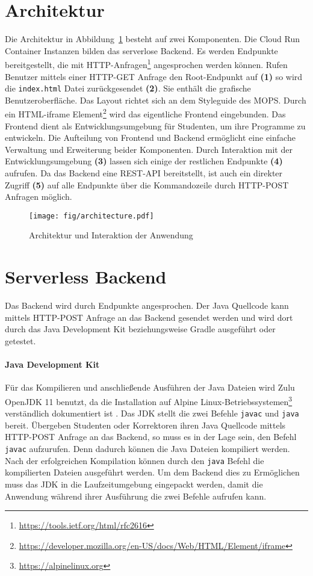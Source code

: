 \section{Architektur}
Die Architektur in Abbildung~\ref{fig:architecture} besteht auf zwei
Komponenten.
Die Cloud Run Container Instanzen bilden das serverlose Backend.
Es werden Endpunkte bereitgestellt, die mit
HTTP-Anfragen\footnote{\url{https://tools.ietf.org/html/rfc2616}}
angesprochen werden können. Rufen Benutzer
mittels einer HTTP-GET Anfrage den
Root-Endpunkt auf \textbf{(1)} so wird
die \texttt{index.html} Datei zurückgesendet \textbf{(2)}.
Sie enthält die grafische Benutzeroberfläche. Das Layout richtet
sich an dem Styleguide des MOPS. Durch ein
HTML-iframe Element\footnote{\url{https://developer.mozilla.org/en-US/docs/Web/HTML/Element/iframe}}
wird das eigentliche Frontend eingebunden. Das Frontend dient als Entwicklungsumgebung für
Studenten, um ihre Programme zu entwickeln. Die Aufteilung von Frontend und Backend
ermöglicht eine einfache Verwaltung und Erweiterung beider Komponenten.
Durch Interaktion mit der Entwicklungsumgebung \textbf{(3)} lassen sich einige
der restlichen Endpunkte \textbf{(4)} aufrufen. 
Da das Backend eine REST-API bereitstellt, ist auch ein direkter Zugriff \textbf{(5)} auf alle 
Endpunkte über die Kommandozeile durch HTTP-POST Anfragen möglich.

\begin{figure}
  \centering
  \texttt{[image: fig/architecture.pdf]}
  \caption{Architektur und Interaktion der Anwendung}
  \label{fig:architecture}
\end{figure}

\section{Serverless Backend}
Das Backend wird durch Endpunkte angesprochen.
Der Java Quellcode kann mittels HTTP-POST Anfrage an das
Backend gesendet werden und wird dort durch das Java Development Kit
beziehungsweise Gradle ausgeführt oder getestet.


\paragraph{Java Development Kit} Für das Kompilieren und
anschließende Ausführen der Java Dateien wird
Zulu OpenJDK 11 benutzt, da die Installation auf
Alpine Linux-Betriebssystemen\footnote{\url{https://alpinelinux.org}}
verständlich dokumentiert ist \cite{AzulZuluJDK}.
Das JDK stellt die zwei Befehle \texttt{javac} und \texttt{java} bereit.
Übergeben Studenten oder Korrektoren ihren Java Quellcode mittels HTTP-POST Anfrage an
das Backend, so muss es in der Lage sein, den Befehl \texttt{javac}
aufzurufen. Denn dadurch können die Java Dateien kompiliert werden.
Nach der erfolgreichen Kompilation können durch den \texttt{java} Befehl die kompilierten Dateien
ausgeführt werden. Um dem Backend dies zu Ermöglichen muss das JDK in die Laufzeitumgebung eingepackt
werden, damit die Anwendung während ihrer Ausführung die zwei Befehle aufrufen kann.\\

